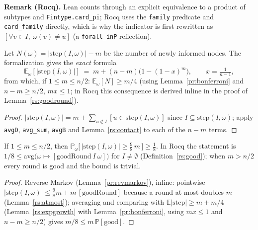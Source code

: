 \noindent\textbf{Remark (Rocq).} Lean counts through an explicit
equivalence to a product of subtypes and \texttt{Fintype.card\_pi}; Rocq
uses the \texttt{family} predicate and \texttt{card\_family} directly,
which is why the indicator is first rewritten as
$[\forall v \in I,\ \omega(v) \ne u]$ (a \texttt{forall\_inP} reflection).

\begin{lemma}\label{rs:expgrowth}
  \rocqok
  Let $N(\omega) = |\mathrm{step}(I,\omega)| - m$ be the number of newly
  informed nodes. The formalization gives the \emph{exact} formula
  \[
    \mathbb{E}_\omega[|\mathrm{step}(I,\omega)|] \;=\;
      m + (n-m)\bigl(1-(1-x)^m\bigr), \qquad x = \tfrac{1}{n-1},
  \]
  from which, if $1 \le m \le n/2$: $\mathbb{E}_\omega[N] \ge m/4$ (using
  Lemma~\ref{pr:bonferroni} and $n - m \ge n/2$, $mx \le 1$; in Rocq this
  consequence is derived inline in the proof of Lemma~\ref{rs:goodround}).
\end{lemma}
\begin{proof}
  \rocqok
  $|\mathrm{step}(I,\omega)| = m + \sum_{u \notin I} [u \in
  \mathrm{step}(I,\omega)]$ since $I \subseteq \mathrm{step}(I,\omega)$;
  apply \texttt{avgD}, \texttt{avg\_sum}, \texttt{avgB} and
  Lemma~\ref{rs:contact} to each of the $n - m$ terms.
\end{proof}

\begin{lemma}\label{rs:goodround}
  \rocqok
  If $1 \le m \le n/2$, then
  $\mathbb{P}_\omega\bigl[\,|\mathrm{step}(I,\omega)| \ge \tfrac{9}{8}\,m\,\bigr]
    \ge \tfrac18$. In Rocq the statement is
  $1/8 \le \mathrm{avg}\bigl(\omega \mapsto [\mathrm{goodRound}\ I\ \omega]\bigr)$
  for $I \ne \emptyset$ (Definition~\ref{rs:good}); when $m > n/2$ every
  round is good and the bound is trivial.
\end{lemma}
\begin{proof}
  \rocqok
  Reverse Markov (Lemma~\ref{pr:revmarkov}), inline: pointwise
  $|\mathrm{step}(I,\omega)| \le \tfrac98 m + m\,[\mathrm{goodRound}]$
  because a round at most doubles $m$ (Lemma~\ref{rs:atmost}); averaging and
  comparing with $\mathbb{E}|\mathrm{step}| \ge m + m/4$
  (Lemma~\ref{rs:expgrowth} with Lemma~\ref{pr:bonferroni}, using
  $m x \le 1$ and $n - m \ge n/2$) gives
  $m/8 \le m\,\mathbb{P}[\mathrm{good}]$.
\end{proof}

